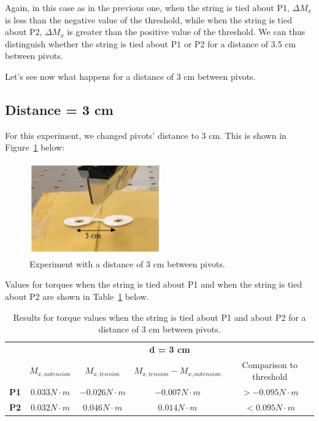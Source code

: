 Again, in this case as in the previous one, when the string is tied about P1, $\Delta M_{x}$ is less than the negative value of the threshold, while when the string is tied about P2, $\Delta M_{x}$ is greater than the positive value of the threshold. We can thus distinguish whether the string is tied about P1 or P2 for a distance of 3.5 cm between pivots.

Let's see now what happens for a distance of 3 cm between pivots.

\subsection{Distance = 3 cm}
For this experiment, we changed pivots' distance to 3 cm. This is shown in Figure~\ref{fig:distance3} below:
\begin{figure}[h!]
	\centering
	\includegraphics[height=40mm]{chapters/figures/experiments/exp3_distance3.jpg}
	\caption{Experiment with a distance of 3 cm between pivots.}
	\label{fig:distance3}
\end{figure}

Values for torques when the string is tied about P1 and when the string is tied about P2 are shown in Table~\ref{tab:distance3} below.
\begin{table}[htbp]
	\centering
	\begin{tabular}{|l|c|c|c|c|}
		\cmidrule{2-5}    \multicolumn{1}{r|}{} & \multicolumn{4}{c|}{\textbf{d = 3 cm}} \\
		\cmidrule{2-5}    \multicolumn{1}{r|}{} & \multicolumn{1}{l|}{\textbf{$M_{x, no tension}$}} & \textbf{$M_{x, tension}$} & \textbf{$M_{x, tension} - M_{x, no tension}$} & Comparison to threshold \\
		\midrule
		\textbf{P1} & $0.033 N \cdot m$ & $-0.026 N \cdot m$ & $-0.007 N \cdot m$ & $> -0.095 N \cdot m$ \\
		\midrule
		\textbf{P2} & $0.032 N \cdot m$ & $0.046 N \cdot m$ & $0.014 N \cdot m$ & $< 0.095 N \cdot m$ \\
		\bottomrule
	\end{tabular}%
	\caption{Results for torque values when the string is tied about P1 and about P2 for a distance of 3 cm between pivots.}
	\label{tab:distance3}%
\end{table}%

